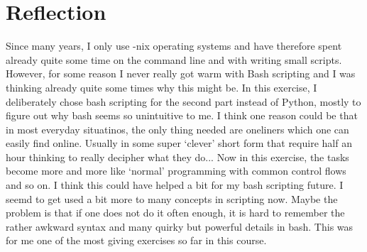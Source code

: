 \documentclass[a4paper,11pt,twoside]{article}
\begin{document}
\section{Reflection}
Since many years, I only use -nix operating systems and have therefore spent already quite some time on the command line and with writing small scripts. However, for some reason I never really got warm with Bash scripting and I was thinking already quite some times why this might be. In this exercise, I deliberately chose bash scripting for the second part instead of Python, mostly to figure out why bash seems so unintuitive to me. I think one reason could be that in most everyday situatinos, the only thing needed are oneliners which one can easily find online. Usually in some super `clever' short form that require half an hour thinking to really decipher what they do... Now in this exercise, the tasks become more and more like `normal' programming with common control flows and so on. I think this could have helped a bit for my bash scripting future. I seemd to get used a bit more to many concepts in scripting now. Maybe the problem is that if one does not do it often enough, it is hard to remember the rather awkward syntax and many quirky but powerful details in bash. This was for me one of the most giving exercises so far in this course. 


%
\end{document}
